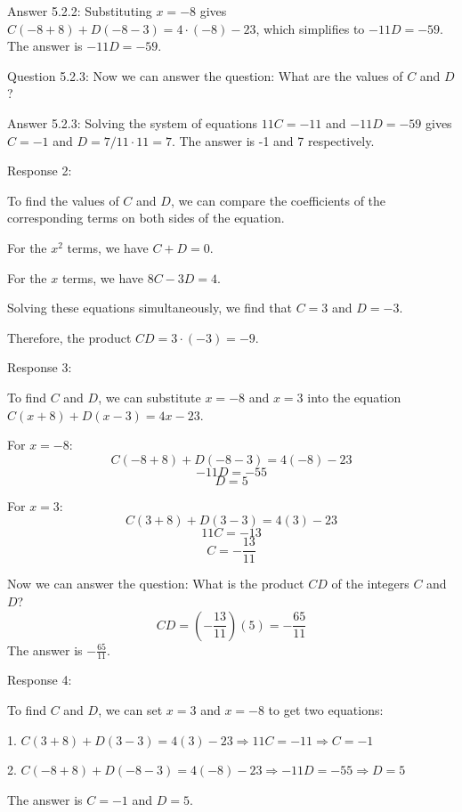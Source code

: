 \begin{center}
\begin{tcolorbox}[width=1\linewidth,title={\textbf{An Example ICL Demonstration of MATH-500 for Aggregators: User Query}}]
Answer 5.2.2: Substituting $x = -8$ gives $C(-8 + 8) + D(-8 - 3) = 4 \cdot (-8) - 23$, which simplifies to $-11D = -59$. The answer is $-11D = -59$.

Question 5.2.3: Now we can answer the question: What are the values of $C$ and $D$?

Answer 5.2.3: Solving the system of equations $11C = -11$ and $-11D = -59$ gives $C = -1$ and $D = 7/11 \cdot 11 = 7$. The answer is -1 and 7 respectively.

Response 2:

To find the values of $C$ and $D$, we can compare the coefficients of the corresponding terms on both sides of the equation.

For the $x^2$ terms, we have $C + D = 0$.

For the $x$ terms, we have $8C - 3D = 4$.

Solving these equations simultaneously, we find that $C = 3$ and $D = -3$.

Therefore, the product $CD = 3 \cdot (-3) = \boxed{-9}$.

Response 3:

To find $C$ and $D$, we can substitute $x = -8$ and $x = 3$ into the equation $C(x + 8) + D(x - 3) = 4x - 23$.

For $x = -8$:
\[C(-8 + 8) + D(-8 - 3) = 4(-8) - 23\]
\[-11D = -55\]
\[D = 5\]

For $x = 3$:
\[C(3 + 8) + D(3 - 3) = 4(3) - 23\]
\[11C = -13\]
\[C = -\frac{13}{11}\]

Now we can answer the question: What is the product $CD$ of the integers $C$ and $D$?
\[CD = \left(-\frac{13}{11}\right)(5) = -\frac{65}{11}\]
The answer is $-\frac{65}{11}$.

Response 4:

To find $C$ and $D$, we can set $x = 3$ and $x = -8$ to get two equations:

1. $C(3 + 8) + D(3 - 3) = 4(3) - 23 \Rightarrow 11C = -11 \Rightarrow C = -1$

2. $C(-8 + 8) + D(-8 - 3) = 4(-8) - 23 \Rightarrow -11D = -55 \Rightarrow D = 5$

The answer is $C = -1$ and $D = 5$.


	\end{tcolorbox}
\end{center}



\newpage


